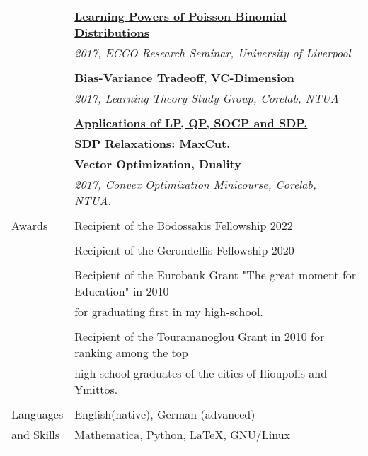 \documentclass[letterpaper,11pt,oneside]{article}
\begin{document}
\begin{longtable}{@{} l l}
 &\href{https://vkonton.github.io/assets/talks/pbdPowers.pdf}
 {\textbf{Learning Powers of Poisson Binomial Distributions}}\\
 &\emph{2017, ECCO Research Seminar, University of Liverpool} \\
&\\

  &\href{https://vkonton.github.io/assets/talks/learning1.pdf}{\textbf{Bias-Variance Tradeoff}},
  \href{https://vkonton.github.io/assets/talks/learning2.pdf}{\textbf{VC-Dimension}}\\
  &\emph{2017, Learning Theory Study Group, Corelab, NTUA}\\
  &\\

  &\href{https://vkonton.github.io/talks/}{\textbf{Applications of LP, QP, SOCP and SDP.}}\\
  &\textbf{SDP Relaxations: MaxCut.}\\
  &\textbf{Vector Optimization, Duality} \\
  &\emph{2017, Convex Optimization Minicourse, Corelab, NTUA.}\\
  &\\



 \Large{Awards}

 & Recipient of the Bodossakis Fellowship 2022 \\
 & \\

 & Recipient of the Gerondellis Fellowship 2020 \\
 & \\

 & Recipient of the Eurobank Grant "The great moment for Education" in 2010\\
 & for graduating first in my high-school. \\
 &\\

 & Recipient of the Touramanoglou Grant in 2010 for ranking among the top \\
 & high school graduates of the cities of Ilioupolis and Ymittos. \\
 &\\

  \Large{Languages}   & English(native), German (advanced) \\
\Large{and Skills}    & Mathematica, Python, \LaTeX, GNU/Linux\\
&\\



\end{longtable}
\end{document}
